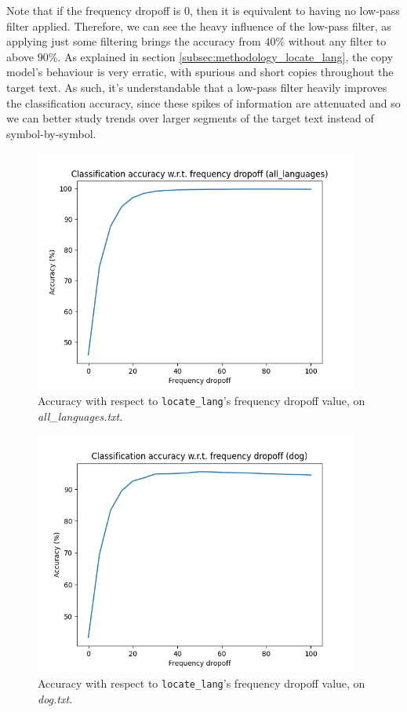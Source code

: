 \documentclass{article}
\begin{document}
Note that if the frequency dropoff is 0, then it is equivalent to having no low-pass filter applied.
Therefore, we can see the heavy influence of the low-pass filter, as applying just some filtering brings the accuracy from $40\%$ without any filter to above $90\%$.
As explained in section \ref{subsec:methodology_locate_lang}, the copy model's behaviour is very erratic, with spurious and short copies throughout the target text.
As such, it's understandable that a low-pass filter heavily improves the classification accuracy, since these spikes of information are attenuated and so we can better study trends over larger segments of the target text instead of symbol-by-symbol.

\begin{figure}
    \centering
    \includegraphics[width=0.95\textwidth]{../results/all_languages/ll-f.png}
    \caption{Accuracy with respect to \texttt{locate\_lang}'s frequency dropoff value, on \textit{all\_languages.txt}.}
    \label{fig:ll_f_all_languages}
\end{figure}

\begin{figure}
    \centering
    \includegraphics[width=0.95\textwidth]{../results/dog/ll-f.png}
    \caption{Accuracy with respect to \texttt{locate\_lang}'s frequency dropoff value, on \textit{dog.txt}.}
    \label{fig:ll_f_dog}
\end{figure}
\end{document}
